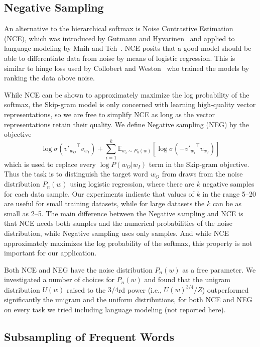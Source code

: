 \documentclass{article}
\begin{document}
\subsection{Negative Sampling}

An alternative to the hierarchical softmax is Noise Contrastive
Estimation (NCE), which was introduced by Gutmann and Hyvarinen~\cite{nce}
and applied to language modeling by Mnih and Teh~\cite{mnih-nce}.
NCE posits that a good model should be able to
differentiate data from noise by means of logistic regression. This is
similar to hinge loss used by Collobert and Weston~\cite{collobert} who trained
the models by ranking the data above noise.

While NCE can be shown to approximately maximize the log
probability of the softmax, the Skip-gram model is only concerned with learning
high-quality vector representations, so we are free to simplify NCE as
long as the vector representations retain their quality. We define Negative sampling (NEG)
by the objective
 \begin{equation}
   \log \sigma({v'_{w_O}}^\top v_{w_I}) + \sum_{i=1}^k\mathbb E_{w_i\sim
    P_n(w)}\left[\log \sigma(-{v'_{w_i}}^\top v_{w_I})\right]
 \end{equation}
which is used to replace every $\log P(w_O|w_I)$ term in the Skip-gram objective.
Thus the task is to distinguish the target word
$w_O$ from draws from the noise distribution $P_n(w)$ using logistic regression,
where there are $k$ negative
samples for each data sample. Our experiments indicate that values of $k$
in the range 5--20 are useful for small training datasets, while for large datasets
the $k$ can be as small as 2--5. The main difference between the Negative sampling and NCE is that NCE
needs both samples and the numerical probabilities of the noise distribution,
while Negative sampling uses only samples. And while NCE approximately maximizes the log probability
of the softmax, this property is not important for our application.

Both NCE and NEG have the noise distribution $P_n(w)$ as
a free parameter. We investigated a number of choices for $P_n(w)$
and found that the unigram distribution $U(w)$ raised to the $3/4$rd
power (i.e., $U(w)^{3/4}/Z$) outperformed significantly the unigram
and the uniform distributions, for both NCE and NEG on every task we tried
including language modeling (not reported here).

\subsection{Subsampling of Frequent Words}
\end{document}
